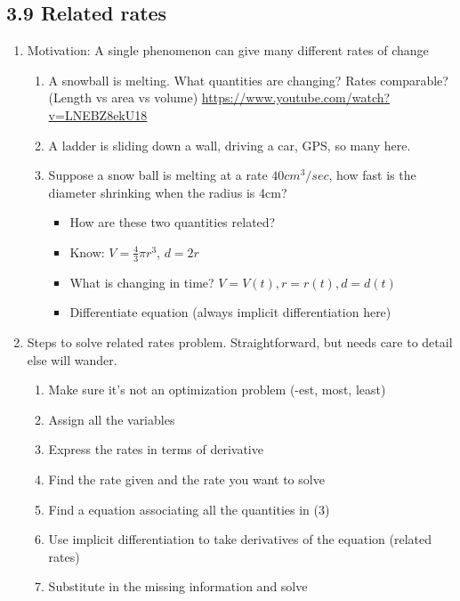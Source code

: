 \documentclass{article}
\begin{document}
\subsection{3.9 Related rates}
\begin{enumerate}

\item Motivation: A single phenomenon can give many different rates of change
\begin{enumerate}
\item A snowball is melting. What quantities are changing? Rates comparable? (Length vs area vs volume)
\url{https://www.youtube.com/watch?v=LNEBZ8ekU18}
\item A ladder is sliding down a wall, driving a car, GPS, so many here.
\item Suppose a snow ball is melting at a rate $40cm^3/sec$, how fast is the diameter shrinking when the radius is 4cm?
\begin{itemize}
\item How are these two quantities related? 
\item Know: $V=\frac{4}{3}\pi r^3$, $d=2r$
\item What is changing in time? $V=V(t), r=r(t), d=d(t)$
\item Differentiate equation (always implicit differentiation here)
\end{itemize}
\end{enumerate}

\item Steps to solve related rates problem. Straightforward, but needs care to detail else will wander.
\begin{enumerate}
\item Make sure it's not an optimization problem (-est, most, least)
\item Assign all the variables 
\item Express the rates in terms of derivative 
\item Find the rate given and the rate you want to solve
\item Find a equation associating all the quantities in (3)
\item Use implicit differentiation to take derivatives of the equation (related rates)
\item Substitute in the missing information and solve
\end{enumerate}



\end{enumerate}
\end{document}
